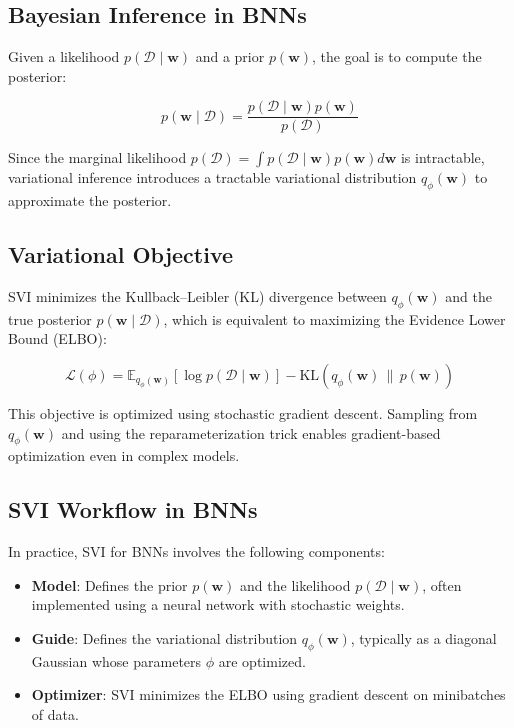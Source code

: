 \documentclass[11pt]{article}
\begin{document}
\subsection{Bayesian Inference in BNNs}

Given a likelihood $p(\mathcal{D} \mid \mathbf{w})$ and a prior $p(\mathbf{w})$, the goal is to compute the posterior:

\[
p(\mathbf{w} \mid \mathcal{D}) = \frac{p(\mathcal{D} \mid \mathbf{w}) p(\mathbf{w})}{p(\mathcal{D})}
\]

Since the marginal likelihood $p(\mathcal{D}) = \int p(\mathcal{D} \mid \mathbf{w}) p(\mathbf{w}) d\mathbf{w}$ is intractable, variational inference introduces a tractable variational distribution $q_\phi(\mathbf{w})$ to approximate the posterior.

\subsection{Variational Objective}

SVI minimizes the Kullback–Leibler (KL) divergence between $q_\phi(\mathbf{w})$ and the true posterior $p(\mathbf{w} \mid \mathcal{D})$, which is equivalent to maximizing the Evidence Lower Bound (ELBO):

\[
\mathcal{L}(\phi) = \mathbb{E}_{q_\phi(\mathbf{w})} [\log p(\mathcal{D} \mid \mathbf{w})] - \text{KL}(q_\phi(\mathbf{w}) \,\|\, p(\mathbf{w}))
\]

This objective is optimized using stochastic gradient descent. Sampling from $q_\phi(\mathbf{w})$ and using the reparameterization trick enables gradient-based optimization even in complex models.

\subsection{SVI Workflow in BNNs}

In practice, SVI for BNNs involves the following components:

\begin{itemize}
    \item \textbf{Model}: Defines the prior $p(\mathbf{w})$ and the likelihood $p(\mathcal{D} \mid \mathbf{w})$, often implemented using a neural network with stochastic weights.
    \item \textbf{Guide}: Defines the variational distribution $q_\phi(\mathbf{w})$, typically as a diagonal Gaussian whose parameters $\phi$ are optimized.
    \item \textbf{Optimizer}: SVI minimizes the ELBO using gradient descent on minibatches of data.
\end{itemize}
\end{document}
